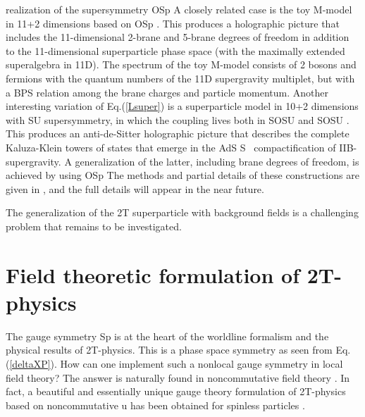 \documentclass[a4paper,12pt]{article}
\begin{document}
realization of the supersymmetry OSp\coordHE{} A
closely related case is the toy M-model in 11+2 dimensions based
on OSp\coordHE{} \cite{super2t}\cite{survey2T}. This
produces a holographic picture that includes the 11-dimensional
2-brane and 5-brane degrees of freedom in addition to the
11-dimensional superparticle phase space (with the maximally
extended superalgebra in 11D). The spectrum of the toy M-model
consists of 2\coordHE{} bosons and \coordHE{} fermions with the quantum
numbers of the 11D supergravity multiplet, but with a BPS relation
among the brane charges and particle momentum. Another interesting
variation of Eq.(\ref{Lsuper}) is a superparticle model in 10+2
dimensions with SU\coordHE{} supersymmetry, in which
the coupling \coordHE{} lives both in SO\coordHE{}SU\coordHE{} and SO\myHighlight{$\left( 6\right) =$}\coordHE{}SU\myHighlight{$\left( 4\right) $}\coordHE{}
\cite{super2t}\cite{survey2T}. This produces an anti-de-Sitter
holographic picture that describes the complete Kaluza-Klein
towers of states that emerge in the AdS\coordHE{} S\coordHE{} \
compactification of IIB-supergravity. A generalization of the
latter, including brane degrees of freedom, is achieved by using
OSp\myHighlight{$\left( 8|8\right) .$}\coordHE{} The methods and partial details of these
constructions are given in \cite{super2t}\cite{survey2T}, and the
full details will appear in the near future.

The generalization of the 2T superparticle with background fields is a
challenging problem that remains to be investigated.

\section{Field theoretic formulation of 2T-physics}

The gauge symmetry Sp\coordHE{} is at the heart of the
worldline formalism and the physical results of 2T-physics. This
is a phase space symmetry as seen from Eq.(\ref{deltaXP}). How
can one implement such a nonlocal gauge symmetry in local field
theory? The answer is naturally found in noncommutative field
theory \cite{NCSp}. In fact, a beautiful and essentially unique
gauge theory formulation of 2T-physics based on noncommutative
u\coordHE{} has been obtained  for spinless
particles \cite{NCu11}.
\end{document}
